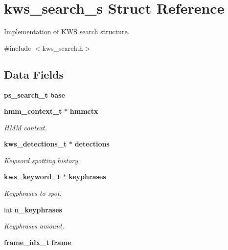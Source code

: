 \section{kws\-\_\-search\-\_\-s Struct Reference}
\label{structkws__search__s}


Implementation of K\-W\-S search structure.  




{\ttfamily \#include $<$kws\-\_\-search.\-h$>$}

\subsection*{Data Fields}
\begin{DoxyCompactItemize}
\item 
{\bf ps\-\_\-search\-\_\-t} {\bfseries base}\label{structkws__search__s_a2fe82b392de65317a6b616681683942e}

\item 
{\bf hmm\-\_\-context\-\_\-t} $\ast$ {\bf hmmctx}
\begin{DoxyCompactList}\small\item\em H\-M\-M context. \end{DoxyCompactList}\item 
{\bf kws\-\_\-detections\-\_\-t} $\ast$ {\bf detections}\label{structkws__search__s_ac7bd23ef33f85b4173a8d9a7cc9b9a32}

\begin{DoxyCompactList}\small\item\em Keyword spotting history. \end{DoxyCompactList}\item 
{\bf kws\-\_\-keyword\-\_\-t} $\ast$ {\bf keyphrases}\label{structkws__search__s_a0eec404435d9f8ad2700487f8a178f48}

\begin{DoxyCompactList}\small\item\em Keyphrases to spot. \end{DoxyCompactList}\item 
int {\bf n\-\_\-keyphrases}\label{structkws__search__s_acd47cbdc3c0708d869888b99e6f5982c}

\begin{DoxyCompactList}\small\item\em Keyphrases amount. \end{DoxyCompactList}\item 
{\bf frame\-\_\-idx\-\_\-t} {\bf frame}\label{structkws__search__s_a68a833afd9d01bdf4c2cc640b575eea7}


\end{DoxyCompactItemize}
